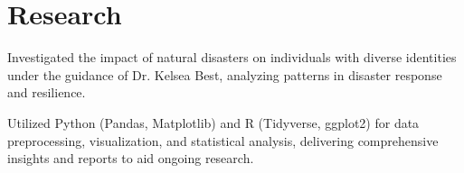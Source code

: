 \documentclass[]{Farhan_Resume_Class}
\begin{document}
\begin{minipage}[t]{0.70\textwidth}
    \section{Research}
    \begin{tightemize}
        \vspace{10pt}
        \item Investigated the impact of natural disasters on individuals with diverse
        identities under the guidance of Dr. Kelsea Best, analyzing patterns in
        disaster response and resilience.
        \item Utilized Python (Pandas, Matplotlib) and R (Tidyverse, ggplot2) for data
        preprocessing, visualization, and statistical analysis, delivering
        comprehensive insights and reports to aid ongoing research.
    \end{tightemize}
\end{minipage}
\end{document}
